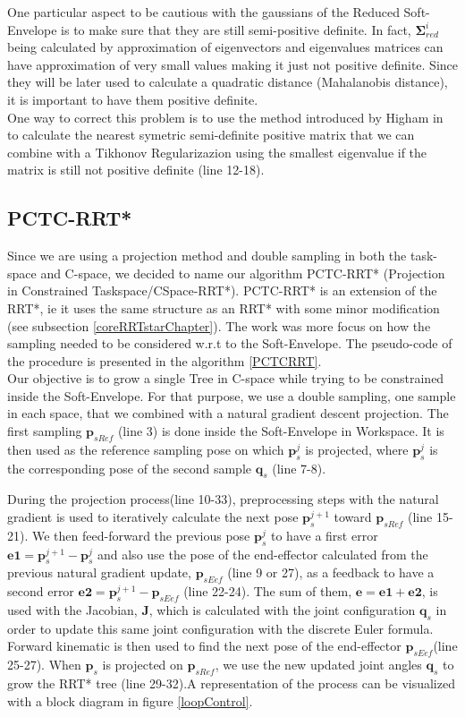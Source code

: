 \documentclass[letterpaper, 10 pt, conference]{ieeeconf}  %
\newcommand{\mb}[1]{{\boldsymbol{#1}}}
\begin{document}
One particular aspect to be cautious with the gaussians of the Reduced Soft-Envelope is to make sure that they are still semi-positive definite. In fact, $\mb{\Sigma}_{red}^{i}$ being calculated by approximation of eigenvectors and eigenvalues matrices can have approximation of very small values making it just not positive definite. Since they will be later used to calculate a quadratic distance (Mahalanobis distance), it is important to have them positive definite.\\
One way to correct this problem is to use the method introduced by Higham in \cite{Nearest_PSDMATRIX} to calculate the nearest symetric semi-definite positive matrix that we can combine with a Tikhonov Regularizazion using the smallest eigenvalue if the matrix is still not positive definite (line 12-18).

\subsection{PCTC-RRT*} 
Since we are using a projection method and double sampling in both the  task-space and C-space,  we decided to name our algorithm PCTC-RRT* (Projection in Constrained Taskspace/CSpace-RRT*). PCTC-RRT* is an extension of the RRT*, ie it uses the same structure as an RRT* with some minor modification (see subsection \ref{coreRRTstarChapter}). The work was more focus on how the sampling needed to be considered w.r.t to the Soft-Envelope. The pseudo-code of the procedure is presented in the algorithm \ref{PCTCRRT}.\\
Our objective is to grow a single Tree in C-space while trying to be constrained inside the Soft-Envelope. For that purpose, we use a double sampling, one sample in each space, that we combined with a natural gradient descent projection.
The first sampling $\mb{p}_{sRef}$ (line 3) is done inside the Soft-Envelope in Workspace. It is then used as the reference sampling pose on which $\mb{p}_s^j$ is projected, where $\mb{p}_s^j$ is the corresponding pose of the second sample $\mb{q}_s$ (line 7-8).

During the projection process(line 10-33), preprocessing steps with the natural gradient is used to iteratively calculate the next pose $\mb{p}_s^{j+1}$ toward $\mb{p}_{sRef}$  (line 15-21). We then feed-forward the previous pose $\mb{p}_s^{j}$ to have a first error $\mb{e1}=\mb{p}_s^{j+1} - \mb{p}_s^{j}$ and also use the pose of the end-effector calculated from the previous natural gradient update, $\mb{p}_{sEef}$ (line 9 or 27), as a feedback to have a second error $\mb{e2}=\mb{p}_s^{j+1} - \mb{p}_{sEef}$ (line 22-24). The sum of them, $\mb{e}=\mb{e1}+\mb{e2}$, is used with the Jacobian, $\mb{J}$, which is calculated with the joint configuration $\mb{q}_s$ in order to update this same joint configuration with the discrete Euler formula. Forward kinematic is then used to find the next pose of the end-effector $\mb{p}_{sEef}$(line 25-27). When $\mb{p}_s$ is projected on $\mb{p}_{sRef}$, we use the new updated joint angles $\mb{q}_s$ to grow the RRT* tree (line 29-32).A representation of the process can be visualized with a block diagram in figure \ref{loopControl}.\\
\end{document}
